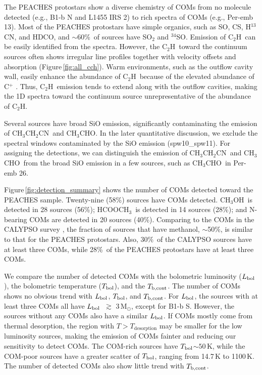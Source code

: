 \documentclass[twocolumn]{aastex62}
\newcommand{\msun}{\mbox{\,M$_\odot$}}
\newcommand{\lbol}{\mbox{$L_{\rm bol}$}}
\newcommand{\tbol}{\mbox{$T_{\rm bol}$}}
\newcommand{\tbc}{\mbox{$T_{\rm b, cont}$}}
\newcommand{\htcn}{\mbox{H$^{13}$CN}}
\newcommand{\methylformate}{\mbox{HCOOCH$_{3}$}}
\newcommand{\methanol}{\mbox{CH$_{3}$OH}}
\newcommand{\acetaldehyde}{\mbox{CH$_{3}$CHO}}
\newcommand{\ethylcyanide}{\mbox{CH$_{3}$CH$_{2}$CN}}
\newcommand{\cch}{\mbox{C$_2$H}}
\begin{document}
The PEACHES protostars show a diverse chemistry of COMs from no molecule detected (e.g., B1-b N and L1455 IRS 2) to rich spectra of COMs (e.g., Per-emb 13).  Most of the PEACHES protostars have simple organics, such as SO, CS, \htcn, and HDCO, and $\sim 60$\%\ of sources have SO$_{2}$ and $^{34}$SO.  Emission of \cch\ can be easily identified from the spectra.  However, the \cch\ toward the continuum sources often shows irregular line profiles together with velocity offsets and absorption (Figure\,\ref{fig:all_cch}).  Warm environments, such as the outflow cavity wall, easily enhance the abundance of \cch\ because of the elevated abundance of C$^{+}$ \citep[e.g., ][]{2018ApJ...864...76Z,2019ApJ...873L..21I}.  Thus, \cch\ emission tends to extend along with the outflow cavities, making the 1D spectra toward the continuum source unrepresentative of the abundance of \cch.

Several sources have broad SiO emission, significantly contaminating the emission of \ethylcyanide\ and \acetaldehyde.  In the later quantitative discussion, we exclude the spectral windows contaminated by the SiO emission (spw10\_spw11).  For assigning the detections, we can distinguish the emission of \ethylcyanide\ and \acetaldehyde\ from the broad SiO emission in a few sources, such as \acetaldehyde\ in Per-emb 26.

Figure\,\ref{fig:detection_summary} shows the number of COMs detected toward the PEACHES sample.  Twenty-nine (58\%) sources have COMs detected.  \methanol\ is detected in 28 sources (56\%); \methylformate\ is detected in 14 sources (28\%); and N-bearing COMs are detected in 20 sources (40\%).  Comparing to the COMs in the CALYPSO survey \citep{2020AA...635A.198B}, the fraction of sources that have methanol, $\sim$50\%, is similar to that for the PEACHES protostars.  Also, 30\%\ of the CALYPSO sources have at least three COMs, while 28\%\ of the PEACHES protostars have at least three COMs.

We compare the number of detected COMs with the bolometric luminosity (\lbol), the bolometric temperature (\tbol), and the \tbc.  The number of COMs shows no obvious trend with \lbol, \tbol, and \tbc.  For \lbol, the sources with at least three COMs all have \lbol\ $\gtrsim$ 3\msun, except for B1-b S.  However, the sources without any COMs also have a similar \lbol.  If COMs mostly come from thermal desorption, the region with $T > T_\text{desorption}$ may be smaller for the low luminosity sources, making the emission of COMs fainter and reducing our sensitivity to detect COMs.
The COM-rich sources have \tbol$\sim 50$\,K, while the COM-poor sources have a greater scatter of \tbol, ranging from 14.7\,K to 1100\,K.  The number of detected COMs also show little trend with \tbc.  
\end{document}
